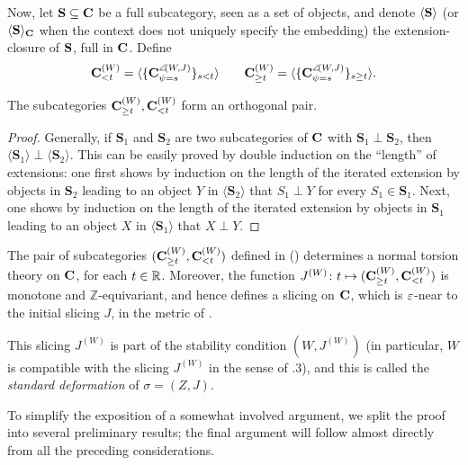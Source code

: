 Now, let $\mathbf{S}\subseteq \mathbf{C}$ be a full subcategory, seen as a set of objects, and denote $\langle \mathbf{S}\rangle$ (or $\langle \mathbf{S}\rangle_{\mathbf{C}}$ when the context does not uniquely specify the embedding) the extension\hyp{}closure of $\mathbf{S}$, full in $\mathbf{C}$. Define
\[\label{these.are.the.aisles}
\mathbf{C}^{(W)}_{< t}=\langle \{\mathbf{C}^{\angle\!(W,J)}_{\psi=s}\}_{s<t}\rangle\qquad \mathbf{C}^{(W)}_{\geq t}=\langle \{\mathbf{C}^{\angle\!(W,J)}_{\psi=s}\}_{s\geq t}\rangle.
\]
\begin{lemma}
The subcategories $\mathbf{C}^{(W)}_{\geq t}, \mathbf{C}^{(W)}_{<t}$ form an orthogonal pair.
\end{lemma}
\begin{proof}
Generally, if $\mathbf{S}_1$ and $\mathbf{S}_2$ are two subcategories of $\mathbf{C}$ with $\mathbf{S}_1\perp \mathbf{S}_2$, then $\langle\mathbf{S}_1\rangle\perp\langle \mathbf{S}_2\rangle$. This can be easily proved by  double induction on the ``length'' of extensions: one first shows by induction on the length of the iterated extension by objects in  $\mathbf{S}_2$ leading to an object $Y$ in $\langle \mathbf{S}_2\rangle$ that $S_1\perp Y$ for every $S_1\in \mathbf{S}_1$. Next, one shows by induction on the length of the iterated  extension by objects in  $\mathbf{S}_1$ leading to an object $X$ in $\langle \mathbf{S}_1\rangle$ that $X\perp Y$. 
\end{proof}

\begin{theorem}\label{thm:funddefo}
The pair of subcategories $(\mathbf{C}^{(W)}_{\geq t},\mathbf{C}^{(W)}_{< t})$ defined in () determines a normal torsion theory on $\mathbf{C}$, for each $t\in\mathbb{R}$. Moreover, the function $J^{(W)}\colon t\mapsto (\mathbf{C}^{(W)}_{\geq t},\mathbf{C}^{(W)}_{< t})$ is monotone and $\mathbb{Z}$\hyp{}equivariant, and hence defines a slicing on $\mathbf{C}$, which is $\varepsilon$\hyp{}near to the initial slicing $J$, in the metric of \adef {}.

This slicing $J^{(W)}$ is part of the stability condition $(W,J^{(W)})$ (in particular, $W$ is compatible with the slicing $J^{(W)}$ in the sense of \adef {}.3), and this is called the \emph{standard deformation} of $\sigma = (Z,J)$.
\end{theorem}
To simplify the exposition of a somewhat involved argument, we split the proof into several preliminary results; the final argument will follow almost directly from all the preceding considerations.

